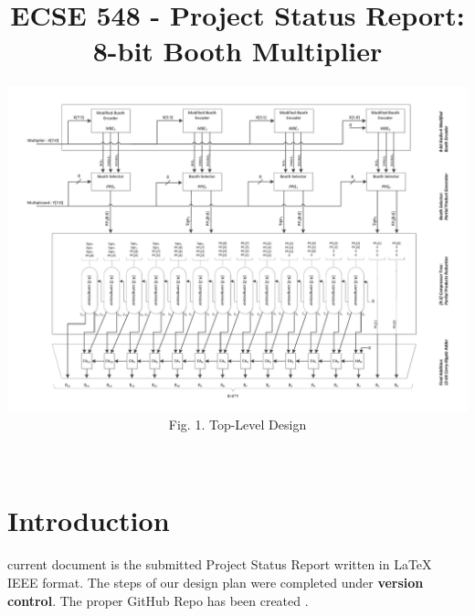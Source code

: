 \documentclass[conference]{IEEEtran}
\begin{document}
\title{ECSE 548 - Project Status Report:\\ 8-bit Booth Multiplier}
\author{

\includegraphics[height=0.3\textheight, width=0.7\linewidth]{BoothTopLevel.pdf}
\\Fig. 1. Top-Level Design\\~\\
}

\maketitle
\IEEEpeerreviewmaketitle

\section{Introduction}
 current document is the 
submitted Project Status Report written in 
\LaTeX ~ IEEE format. The steps of
our design plan were completed under \textbf{version control}.
The proper GitHub Repo has been created \cite{git}. 
\end{document}
